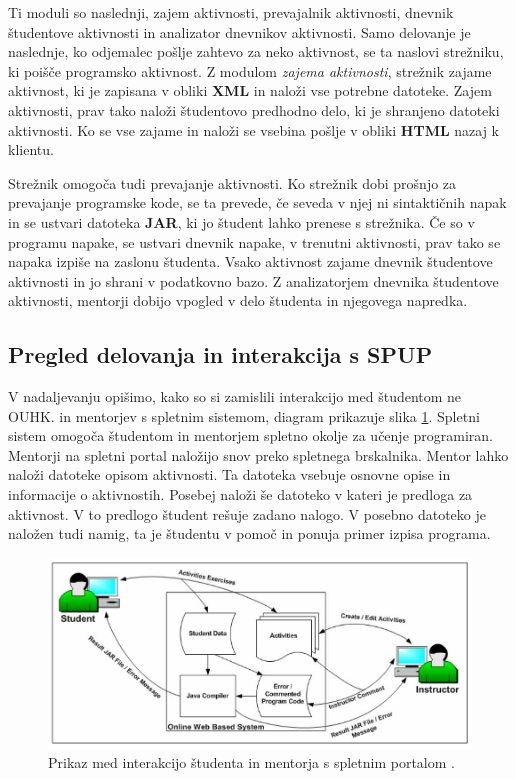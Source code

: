 Ti moduli so naslednji, zajem aktivnosti, prevajalnik aktivnosti,
dnevnik študentove aktivnosti in analizator dnevnikov aktivnosti. Samo
delovanje je naslednje, ko odjemalec pošlje zahtevo za neko aktivnost,
se ta naslovi strežniku, ki poišče programsko aktivnost. Z modulom
\emph{zajema aktivnosti}, strežnik zajame aktivnost, ki je zapisana v
obliki \textbf{XML} in naloži vse potrebne datoteke. Zajem aktivnosti,
prav tako naloži študentovo predhodno delo, ki je shranjeno datoteki
aktivnosti. Ko se vse zajame in naloži se vsebina pošlje v obliki
\textbf{HTML} nazaj k klientu.

Strežnik omogoča tudi prevajanje aktivnosti. Ko strežnik dobi prošnjo
za prevajanje programske kode, se ta prevede, če seveda v njej ni
sintaktičnih napak in se ustvari datoteka \textbf{JAR}, ki jo študent
lahko prenese s strežnika. Če so v programu napake, se ustvari dnevnik
napake, v trenutni aktivnosti, prav tako se napaka izpiše na zaslonu
študenta. Vsako aktivnost zajame dnevnik študentove aktivnosti in jo shrani v
podatkovno bazo. Z analizatorjem dnevnika študentove aktivnosti,
mentorji dobijo vpogled v delo študenta in njegovega napredka.

\subsection{Pregled delovanja in interakcija s SPUP}
\label{sec:pregled_delovanja_in_interakcija}

V nadaljevanju opišimo, kako so si zamislili interakcijo med študentom
ne OUHK.  in mentorjev s spletnim sistemom, diagram prikazuje slika
\ref{fig:OUHK_workFlow}. Spletni sistem omogoča študentom in mentorjem
spletno okolje za učenje programiran. Mentorji na spletni portal
naložijo snov preko spletnega brskalnika. Mentor lahko naloži datoteke
opisom aktivnosti. Ta datoteka vsebuje osnovne opise in informacije o
aktivnostih. Posebej naloži še datoteko v kateri je predloga za
aktivnost. V to predlogo študent rešuje zadano nalogo. V posebno
datoteko je naložen tudi namig, ta je študentu v pomoč in ponuja
primer izpisa programa.

\begin{figure}[htb!] \centering
  \includegraphics[width=0.9\linewidth, keepaspectratio =
1]{./images/SystemArch02_OUHK_DistanceEdu.jpg}
\caption{Prikaz med interakcijo študenta in mentorja s spletnim
  portalom \cite{ITaLCP_DistanceEdu}.}
  \label{fig:OUHK_workFlow}
\end{figure}

